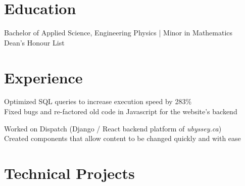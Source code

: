 \documentclass[]{deedy-resume-openfont}
\begin{document}
    
    
    
    
    
    \section{Education}
    Bachelor of Applied Science, Engineering Physics | Minor in Mathematics\\
    Dean's Honour List
    \sectionsep

    \section{Experience}
    
     Optimized SQL queries to increase execution speed by 283\%\\
     Fixed bugs and re-factored old code in Javascript for the website’s backend
    \sectionsep
    
    
     Worked on Dispatch (Django / React backend platform of \textit{ubyssey.ca})\\
     Created components that allow content to be changed quickly and with ease

    \sectionsep
    
    \section{Technical Projects}
    
    
\end{document}
